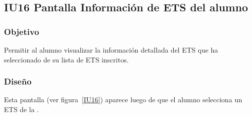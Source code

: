 \subsection{IU16 Pantalla Información de ETS del alumno}

\label{IU16}
\newpage

\subsubsection{Objetivo}
Permitir al alumno visualizar la información detallada del ETS que ha seleccionado de su lista de ETS inscritos.

\subsubsection{Diseño}
Esta pantalla  (ver figura~\ref{IU16}) aparece luego de que el alumno selecciona un ETS de la .

